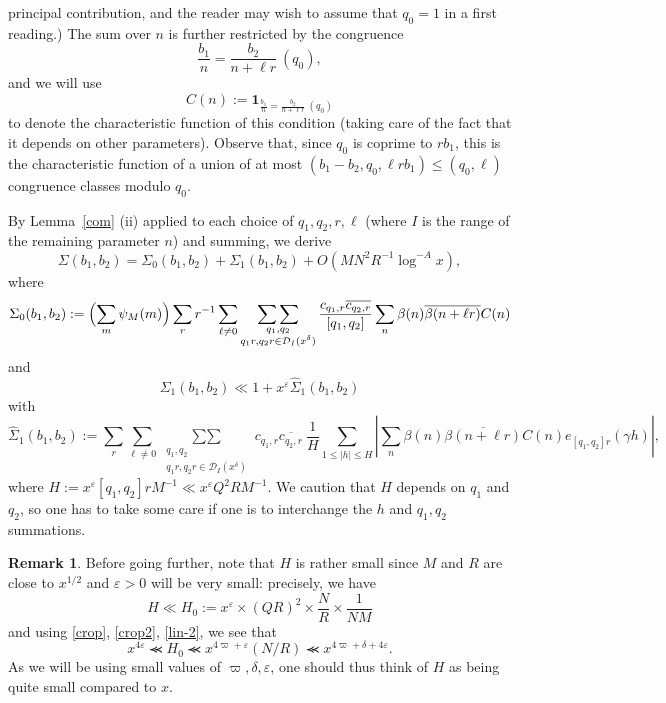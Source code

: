 \documentclass[12pt,a4paper,reqno]{amsart}
\numberwithin{equation}{section}
\theoremstyle{plain}
\theoremstyle{definition}
\newtheorem{remark}[theorem]{Remark}
\newcommand\eps{\varepsilon}
\newcommand{\DIone}[2]{\mathcal{D}_{{#1}}({#2})}
\newcommand\sumsum{\mathop{\sum\sum}\limits}
\renewcommand{\lessapprox}{\llcurly}
\newcommand{\onef}{\mathbf{1}}
\begin{document}
principal contribution, and the reader may wish to assume that $q_0=1$
in a first reading.) The sum over $n$ is further restricted by the
congruence
\begin{equation}\label{eq-n-congruence}
\frac{b_1}{n}=\frac{b_2}{n+\ell r}\ (q_0),
\end{equation}
and we will use
\begin{equation}\label{cn-def}
C(n):=\onef_{\frac{b_1}{n}=\frac{b_2}{n+\ell r}\ (q_0)}
\end{equation}
to denote
the characteristic function of this condition (taking care of the fact that it
depends on other parameters). Observe that, since $q_0$ is coprime to
$rb_1$, this is the characteristic function of a union of at most
$(b_1-b_2,q_0,\ell rb_1)\leq (q_0,\ell)$ congruence classes modulo
$q_0$.
\par 
By Lemma~\ref{com} (ii) applied to each choice of $q_1,q_2,r,\ell$ (where $I$ is the range of the remaining parameter $n$) and summing, we derive
$$
\Sigma(b_1,b_2)=\Sigma_0(b_1,b_2)+\Sigma_1(b_1,b_2)+
O(MN^2R^{-1}\log^{-A}x),
$$
where
$$
  \Sigma_0(b_1,b_2):= \Bigl(\sum_m\psi_M(m)\Bigr)
  \sum_rr^{-1}\sum_{\ell\neq 0}
  \sumsum_{\substack{q_1,q_2\\q_1r,q_2r\in
      \DIone{I}{x^{\delta}}}} \frac{c_{q_1,r}\overline{c_{q_2,r}}}{[q_1,q_2]}\\
  \sum_n\beta(n)\overline{\beta(n+\ell r)}C(n)
$$
and
$$
\Sigma_1(b_1,b_2)\ll 1+ x^{\eps} \hat{\Sigma}_1(b_1,b_2) 
$$
with
$$
\hat{\Sigma}_1(b_1,b_2):= \sum_r\sum_{\ell\neq 0}
\sumsum_{\substack{q_1,q_2\\q_1r,q_2r\in \DIone{I}{x^{\delta}}}}
c_{q_1,r}\overline{c_{q_2,r}}\ \frac{1}{H} \sum_{1\leq |h|\leq
  H}\left|\sum_n\beta(n)\overline{\beta(n+\ell r)}C(n)e_{[q_1,q_2]r}(\gamma
h)\right|,
$$
where $H:=x^{\eps}[q_1,q_2]rM^{-1}\ll x^{\eps}Q^2RM^{-1}$.  We caution that $H$ depends on $q_1$ and $q_2$, so one has to take some care if one is to interchange the $h$ and $q_1,q_2$ summations.

\begin{remark} 
  Before going further, note that $H$ is rather small since $M$ and
  $R$ are close to $x^{1/2}$ and $\eps>0$ will be very small:
  precisely, we have
$$ 
H \ll H_0 :=x^\eps \times (QR)^2 \times \frac{N}{R} \times \frac{1}{NM}
$$
and using \eqref{crop}, \eqref{crop2}, \eqref{lin-2}, we see that
\begin{equation}\label{ao}
  x^{4\eps}\lessapprox 
  H_0 \lessapprox x^{4\varpi+\eps} (N/R) \lessapprox x^{4\varpi + \delta + 4\eps}.
\end{equation}
As we will be using small values of $\varpi,\delta,\eps$, one should
thus think of $H$ as being quite small compared to $x$.
\end{remark}
\end{document}
